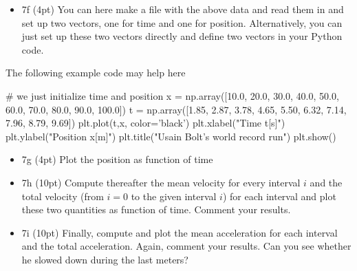 \documentclass[%
oneside,                 %
final,                   %
10pt]{article}
\begin{document}
\noindent
\begin{itemize}
\item 7f (4pt) You can here make a file with the above data and read them in and set up two vectors, one for time and one for position. Alternatively, you can just set up these two vectors directly and define two vectors in your Python code.
\end{itemize}

\noindent
The following example code may help here









\bpycod
# we just initialize time and position
x = np.array([10.0, 20.0, 30.0, 40.0, 50.0, 60.0, 70.0, 80.0, 90.0, 100.0])
t = np.array([1.85, 2.87, 3.78, 4.65, 5.50, 6.32, 7.14, 7.96, 8.79, 9.69])
plt.plot(t,x, color='black')
plt.xlabel("Time t[s]")
plt.ylabel("Position x[m]")
plt.title("Usain Bolt's world record run")
plt.show()

\epycod


\begin{itemize}
\item 7g (4pt) Plot the position as function of time

\item 7h (10pt) Compute thereafter the mean velocity for every interval $i$ and the total velocity (from $i=0$ to the given interval $i$) for each interval and plot these two quantities as function of time. Comment your results.

\item 7i (10pt) Finally, compute and plot the mean acceleration for each interval and the total acceleration. Again, comment your results. Can you see whether he slowed down during the last meters? 
\end{itemize}

\noindent


\end{document}
